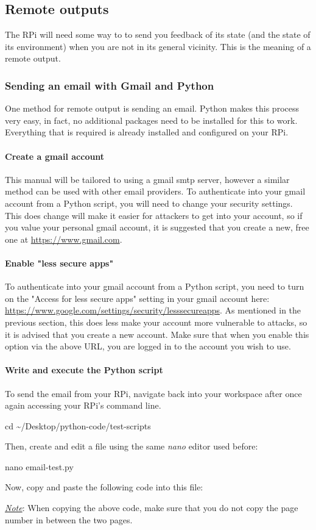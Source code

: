 \documentclass{article}
\newcommand*{\myfont}{\fontfamily{pcr}\selectfont}
\newcommand{\codeb}[2]{
  \begin{tcolorbox}[width=\textwidth,colback={SpringGreen},title={#1},colbacktitle=darkgreen,coltitle=SpringGreen]
    \myfont
    #2
  \end{tcolorbox}
} %
\newcommand{\note}[1]{\underline{\textit{Note}}: #1}
\begin{document}
\subsection{Remote outputs}
The RPi will need some way to to send you feedback of its state (and the state of its environment) when you are not in its general vicinity. This is the meaning of a remote output.
  \subsubsection{Sending an email with Gmail and Python}
  One method for remote output is sending an email. Python makes this process very easy, in fact, no additional packages need to be installed for this to work. Everything that is required is already installed and configured on your RPi.
    \paragraph{Create a gmail account}
    This manual will be tailored to using a gmail smtp server, however a similar method can be used with other email providers. To authenticate into your gmail account from a Python script, you will need to change your security settings. This does change will make it easier for attackers to get into your account, so if you value your personal gmail account, it is suggested that you create a new, free one at \href{https://www.gmail.com}{https://www.gmail.com}.
    \paragraph{Enable "less secure apps"}
    To authenticate into your gmail account from a Python script, you need to turn on the "Access for less secure apps" setting in your gmail account here: \href{https://www.google.com/settings/security/lesssecureapps}{https://www.google.com/settings/security/lesssecureapps}. As mentioned in the previous section, this does less make your account more vulnerable to attacks, so it is advised that you create a new account. Make sure that when you enable this option via the above URL, you are logged in to the account you wish to use.
    \paragraph{Write and execute the Python script}
    To send the email from your RPi, navigate back into your workspace after once again accessing your RPi's command line.
    \codeb{Navigate to your workspace}
    {
      cd \textasciitilde/Desktop/python-code/test-scripts
    }
    Then, create and edit a file using the same \textit{nano} editor used before:
    \codeb{Create email Python testing script file}
    {
      nano email-test.py
    }
    Now, copy and paste the following code into this file:
    
    \note{When copying the above code, make sure that you do not copy the page number in between the two pages.}
\end{document}
